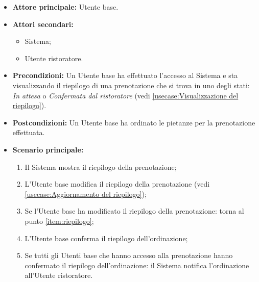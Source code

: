 \label{usecase:Ordinazione collaborativa dei pasti}
\begin{itemize}
	\item \textbf{Attore principale:} Utente base.

	\item \textbf{Attori secondari:}
	      \begin{itemize}
		      \item Sistema;
		      \item Utente ristoratore.
	      \end{itemize}

	\item \textbf{Precondizioni:}
	      Un Utente base ha effettuato l'accesso al Sistema e sta
	      visualizzando il riepilogo di una prenotazione che si trova in uno
	      degli stati: \textit{In attesa} o \textit{Confermata dal ristoratore}
	      (vedi \autoref{usecase:Visualizzazione del riepilogo}).

	\item \textbf{Postcondizioni:}
	      Un Utente base ha ordinato le pietanze per la prenotazione effettuata.

	\item \textbf{Scenario principale:}
	      \begin{enumerate}
		      \item \label{item:riepilogo}
		            Il Sistema mostra il riepilogo della prenotazione;

		      \item L'Utente base modifica il riepilogo della prenotazione
		            (vedi \autoref{usecase:Aggiornamento del riepilogo});

		      \item Se l'Utente base ha modificato il riepilogo della
		            prenotazione: torna al punto \ref{item:riepilogo};

		      \item L'Utente base conferma il riepilogo dell'ordinazione;

		      \item Se tutti gli Utenti base che hanno accesso alla prenotazione
		            hanno confermato il riepilogo dell'ordinazione: il Sistema
		            notifica l'ordinazione all'Utente ristoratore.
	      \end{enumerate}


\end{itemize}

